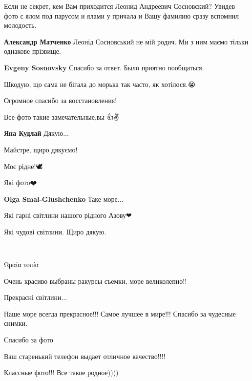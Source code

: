 \begin{multicols}{2}

Если не секрет, кем Вам приходится Леонид Андреевич Сосновский? Увидев фото с
ялом под парусом и ялами у причала и Вашу фамилию сразу вспомнил молодость.

\begin{itemize} %
\textbf{Александр Матченко} Леонід Сосновський не мій родич. Ми з ним маємо тільки однакове прізвище.

\textbf{Evgeny Sosnovsky} Спасибо за ответ. Было приятно пообщаться.
\end{itemize} %


Шкодую, що сама не бігала до морька так часто, як хотілося.😭

Огромное спасибо за восстановления!

Все фото такие замечательные,вы 👍✌️

\textbf{Яна Кудлай} Дякую...

Майстре, щиро дякуємо!

Моє рідне!🕊

Які фото❤️

\textbf{Olga Smal-Glushchenko} Таке море...

Які гарні світлини нашого рідного Азову❤

Які чудові світлини. Щиро дякую.

🙏💔🇺🇦

Ωραία τοπία


Очень красиво выбраны ракурсы съемки, море великолепно!!

Прекрасні світлини...


Наше море всегда прекрасное!!! Самое лучшее в мире!!! Спасибо за чудесные снимки.

Спасибо за фото


Ваш старенький телефон выдает отличное качество!!!!

Классные фото!!! Все такое родное))))



\end{multicols}

